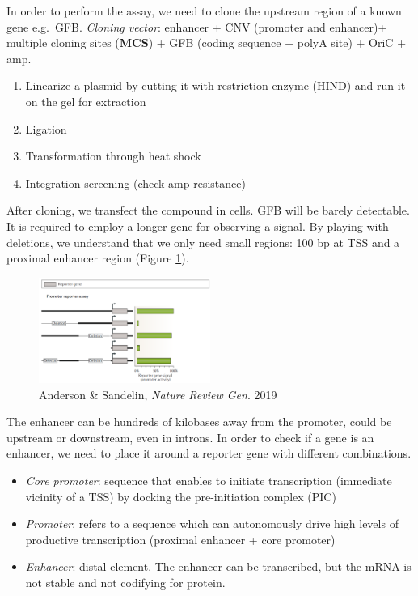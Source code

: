 In order to perform the assay, we need to clone the upstream region of a known gene e.g.~GFB. \emph{Cloning vector}: enhancer + CNV (promoter and enhancer)+ multiple cloning sites (\textbf{MCS}) + GFB (coding sequence + polyA site) + OriC + amp.

\begin{enumerate}
\def\labelenumi{\arabic{enumi}.}
\tightlist
\item
  Linearize a plasmid by cutting it with restriction enzyme (HIND) and run it on the gel for extraction
\item
  Ligation
\item
  Transformation through heat shock
\item
  Integration screening (check amp resistance)
\end{enumerate}

After cloning, we transfect the compound in cells. GFB will be barely detectable. It is required to employ a longer gene for observing a signal. By playing with deletions, we understand that we only need small regions: 100 bp at TSS and a proximal enhancer region (Figure \ref{fig:passay}).

\begin{figure}
\centering
\includegraphics[width=0.5\textwidth]{../_resources/Screenshot_2022-10-10_at_10-45-54.png}
\caption{Anderson \& Sandelin, \emph{Nature Review Gen}. 2019}
\label{fig:passay}
\end{figure}

The enhancer can be hundreds of kilobases away from the promoter, could be upstream or downstream, even in introns. In order to check if a gene is an enhancer, we need to place it around a reporter gene with different combinations.

\begin{itemize}
\tightlist
\item
  \emph{Core promoter}: sequence that enables to initiate transcription (immediate vicinity of a TSS) by docking the pre-initiation complex (PIC)
\item
  \emph{Promoter}: refers to a sequence which can autonomously drive high levels of productive transcription (proximal enhancer + core promoter)
\item
  \emph{Enhancer}: distal element. The enhancer can be transcribed, but the mRNA is not stable and not codifying for protein.
\end{itemize}

